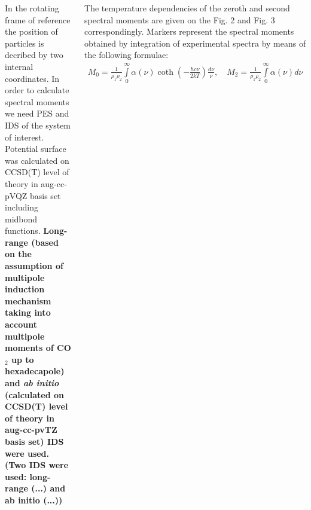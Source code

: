 \documentclass[
  20pt,
  a0paper,
  portrait,
  margin=0mm,
  innermargin=15mm,
  blockverticalspace=0mm,
  colspace=0mm,
  subcolspace=0mm
]{tikzposter}
\newcommand{\lb}{\left(}
\newcommand{\rb}{\right)}
\newcommand{\vverh}{\vspace*{-0.05cm}}
\begin{document}
\begin{columns}
{{In the rotating frame of reference the position of particles is decribed by two internal coordinates. In order to calculate spectral moments we need PES and IDS of the system of interest. Potential surface was calculated on CCSD(T) level of theory in aug-cc-pVQZ basis set including midbond functions. \textbf{Long-range (based on the assumption of multipole induction mechanism taking into account multipole moments of CO$_2$ up to hexadecapole) and \textit{ab initio} (calculated on CCSD(T) level of theory in aug-cc-pvTZ basis set) IDS were used. (Two IDS were used: long-range (...) and ab initio (...))}\par
The temperature dependencies of the zeroth and second spectral moments are given on the Fig. 2 and Fig. 3 correspondingly. Markers represent the spectral moments obtained by integration of experimental spectra by means of the following formulae:
\vverh
\begin{gather}
		M_0 = \frac{1}{\rho_1 \rho_2} \int\limits_{0}^{\infty} \alpha(\nu) \coth \lb - \frac{h c \nu}{2 k T} \rb \frac{d \nu}{\nu}, \quad M_2 = \frac{1}{\rho_1 \rho_2} \int\limits_{0}^{\infty} \alpha(\nu) d \nu \label{eq:m2_spectra}
\end{gather}

}}
\end{columns}
\end{document}
